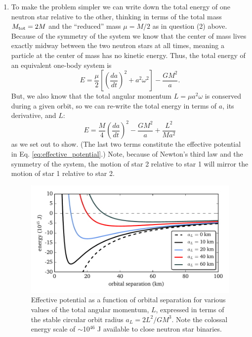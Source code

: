 \documentclass[11pt]{article}
\begin{document}
\begin{enumerate}
\item To make the problem simpler we can write down the total energy of one neutron star relative to the other, thinking in terms of the total mass $M_{\rm tot} = 2M$ and the ``reduced'' mass $\mu = M/2$ as in question (2) above. Because of the symmetry of the system we know that the center of mass lives exactly midway between the two neutron stars at all times, meaning a particle at the center of mass has no kinetic energy. Thus, the total energy of an equivalent one-body system is \[ E = \frac{\mu}{2} \left[ \left(\frac{da}{dt}\right)^2 + a^2\omega^2 \right] - \frac{GM^2}{a}. \] But, we also know that the total angular momentum $L = \mu a^2\omega$ is conserved during a given orbit, so we can re-write the total energy in terms of $a$, its derivative, and $L$:
\begin{equation}
E = \frac{M}{4}\left(\frac{da}{dt}\right)^2 - \frac{GM^2}{a} + \frac{L^2}{Ma^2}
\end{equation}
as we set out to show. (The last two terms constitute the effective potential in Eq. \ref{eq:effective_potential}.) Note, because of Newton's third law and the symmetry of the system, the motion of star 2 relative to star 1 will mirror the motion of star 1 relative to star 2.

\begin{figure}[!b]
\centering
\includegraphics[scale=1]{stable_orbit/kepler_potentials.pdf}
\caption{\label{fig:potentials} Effective potential as a function of orbital separation for various values of the total angular momentum, $L$, expressed in terms of the stable circular orbit radius $a_L = 2L^2/GM^3$. Note the colossal energy scale of $\sim$10$^{46}$ J available to close neutron star binaries.}
\end{figure}


\end{enumerate}
\end{document}
